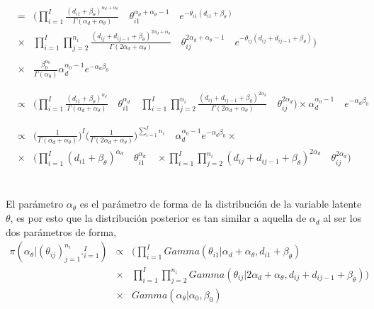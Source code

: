 \\
\begin{eqnarray*}
&=& \bigg(\prod_{i=1}^I \frac{(d_{i1}+\beta_\theta)^{\alpha_d+\alpha_\theta}}{\Gamma(\alpha_d+\alpha_\theta)} \quad \theta_{i1}^{\alpha_d+\alpha_\theta-1}\quad e^{-\theta_{i1}(d_{i1}+\beta_\theta)} \\
&\times& \prod_{i=1}^I \prod_{j=2}^{n_i} \frac{(d_{ij}+d_{ij-1}+\beta_\theta)^{2\alpha_d+\alpha_\theta}}{\Gamma(2\alpha_d+\alpha_\theta)} \quad \theta_{ij}^{2\alpha_d+\alpha_\theta-1} \quad e^{-\theta_{ij}(d_{ij}+d_{ij-1}+\beta_\theta)}\bigg)\\
\\
&\times& \frac{\beta_0^{\alpha_0}}{\Gamma(\alpha_0)} \alpha_d^{\alpha_0-1} e^{-\alpha_d\beta_0}\\
\\
\\
&\propto& \Bigg(\prod_{i=1}^I \frac{(d_{i1}+\beta_\theta)^{\alpha_d}}{\Gamma(\alpha_d+\alpha_\theta)} \quad \theta_{i1}^{\alpha_d} \quad \prod_{i=1}^I \prod_{j=2}^{n_i} \frac{(d_{ij}+d_{ij-1}+\beta_\theta)^{2\alpha_d}}{\Gamma(2\alpha_d+\alpha_\theta)}\quad\theta_{ij}^{2\alpha_d}\Bigg) \times \alpha_d^{\alpha_0-1} \quad e^{-\alpha_d\beta_0}\\
\\
\\
&\propto& \Big(\frac{1}{\Gamma(\alpha_d+\alpha_\theta)}\Big)^I \Big(\frac{1}{\Gamma(2\alpha_d+\alpha_\theta)}\Big)^{\sum_{i=1}^I n_i} \quad \alpha_d^{\alpha_0-1} e^{-\alpha_d\beta_0} \times \\
&\times& \Bigg(\prod_{i=1}^I (d_{i1}+\beta_\theta)^{\alpha_d} \quad \theta_{i1}^{\alpha_d}\quad \times \prod_{i=1}^I \prod_{j=2}^{n_i} (d_{ij}+d_{ij-1}+\beta_\theta)^{2\alpha_d}\quad \theta_{ij}^{2\alpha_d}\Bigg)
\end{eqnarray*}
\\
\\
El par\'ametro $\alpha_\theta$ es el par\'ametro de forma de la distribuci\'on de la variable latente $\theta$, es por esto que la distribuci\'on posterior es tan similar a aquella de $\alpha_d$ al ser los dos par\'ametros de forma,
\begin{eqnarray*}
\pi(\alpha_\theta|(\theta_{ij})_{j=1}^{n_i}._{i=1}^I) &\propto& \Bigg(\prod_{i=1}^I Gamma(\theta_{i1}|\alpha_d+\alpha_\theta, d_{i1}+\beta_\theta)\\
&\times& \prod_{i=1}^I \prod_{j=2}^{n_i} Gamma(\theta_{ij}|2\alpha_d+\alpha_\theta, d_{ij}+d_{ij-1}+\beta_\theta) \Bigg) \\
&\times& Gamma(\alpha_\theta|\alpha_0,\beta_0)\\
\end{eqnarray*}

